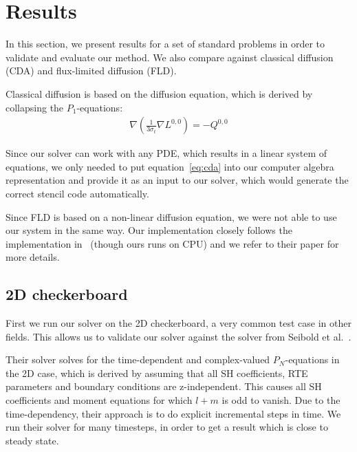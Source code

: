 \section{Results}
\label{sec:results}

In this section, we present results for a set of standard problems in order to validate and evaluate our method. We also compare against classical diffusion (CDA) and flux-limited diffusion (FLD).

Classical diffusion is based on the diffusion equation, which is derived by collapsing the $P_1$-equations:
\begin{align} 
\nabla\left(\frac{1}{3\sigma_t}\nabla L^{0,0}\right)  = -Q^{0,0}
\label{eq:cda}
\end{align}

Since our solver can work with any PDE, which results in a linear system of equations, we only needed to put equation~\ref{eq:cda} into our computer algebra representation and provide it as an input to our solver, which would generate the correct stencil code automatically.

Since FLD is based on a non-linear diffusion equation, we were not able to use our system in the same way. Our implementation closely follows the implementation in~\cite{Koerner14} (though ours runs on CPU) and we refer to their paper for more details.

\subsection{2D checkerboard}

First we run our solver on the 2D checkerboard, a very common test case in other fields. This allows us to validate our solver against the solver from Seibold et al.~\cite{Seibold14}.

Their solver solves for the time-dependent and complex-valued $P_N$-equations in the 2D case, which is derived by assuming that all SH coefficients, RTE parameters and boundary conditions are z-independent. This causes all SH coefficients and moment equations for which $l+m$ is odd to vanish. Due to the time-dependency, their approach is to do explicit incremental steps in time. We run their solver for many timesteps, in order to get a result which is close to steady state.

\begin{figure}[h]
\centering
\begin{subfigure}{0.45\columnwidth}
\end{subfigure}%
\hspace{0.05\columnwidth}
\begin{subfigure}{0.45\columnwidth}
\end{subfigure}%
\vspace{-0.2in}
\label{fig:vs_starmap}
\end{figure}

